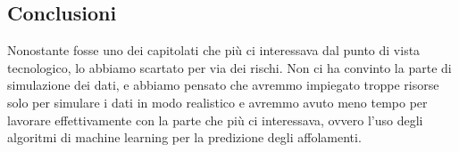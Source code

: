 \documentclass[../studio-di-fattibilita.tex]{subfiles}
\begin{document}
\subsection{Conclusioni}%
\label{sub:c3_conclusioni}
Nonostante fosse uno dei capitolati che più ci interessava dal punto di vista tecnologico, lo abbiamo scartato per via dei rischi. Non ci ha convinto la parte di simulazione dei dati, e abbiamo pensato che avremmo impiegato troppe risorse solo per simulare i dati in modo realistico e avremmo avuto meno tempo per lavorare effettivamente con la parte che più ci interessava, ovvero l’uso degli algoritmi di machine learning per la predizione degli affolamenti.
\end{document}

